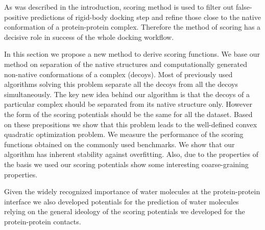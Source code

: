 As was described in the introduction, scoring method is used to filter out false-positive predictions of rigid-body docking step and refine those close to the
native conformation of a protein-protein complex. Therefore the method of scoring has a decisive role in success of the whole docking workflow. 

In this section
we propose a new method to derive scoring functions. We base our method on separation of the native structures and computationally generated non-native conformations of a complex (decoys). Most of
previously used algorithms solving this problem separate all the decoys from all the decoys simultaneously. The key new idea behind our algorithm is that the decoys of 
a particular complex should be separated from its native structure only. However the form of the scoring potentials should be the same for all the dataset. Based on these
prepositions we show that this problem leads to the well-defined convex quadratic optimization problem. We measure the performance of the scoring functions obtained 
on the commonly used benchmarks. We show that our algorithm has inherent stability against overfitting. Also, due to the properties of the basis we used our scoring 
potentials show some interesting coarse-graining properties.

Given the widely recognized importance of water molecules at the protein-protein interface we also developed potentials 
for the prediction of water molecules relying on the general ideology of the scoring potentials we developed for the 
protein-protein contacts.